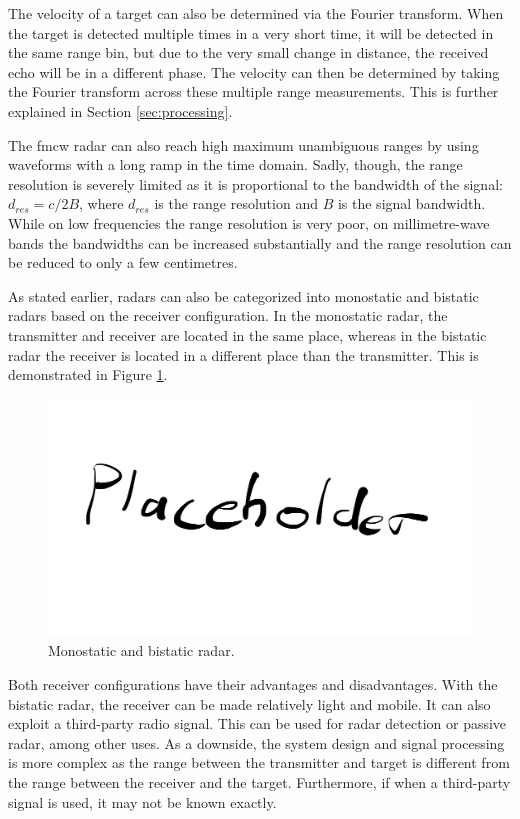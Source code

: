 The velocity of a target can also be determined via the Fourier transform.
When the target is detected multiple times in a very short time,
it will be detected in the same range bin,
but due to the very small change in distance,
the received echo will be in a different phase.
The velocity can then be determined 
by taking the Fourier transform across these multiple range measurements.
This is further explained in Section \ref{sec:processing}.

The \gls{fmcw} radar can also reach high maximum unambiguous ranges
by using waveforms with a long ramp in the time domain.
Sadly, though, the range resolution is severely limited 
as it is proportional to the bandwidth of the signal:
$d_{res} = c/2B$, where $d_{res}$ is the range resolution and $B$ is the signal bandwidth.
While on low frequencies the range resolution is very poor,
on millimetre-wave bands the bandwidths can be increased substantially 
and the range resolution can be reduced to only a few centimetres.

As stated earlier,
radars can also be categorized into monostatic and bistatic radars
based on the receiver configuration.
In the monostatic radar,
the transmitter and receiver are located in the same place,
whereas in the bistatic radar the receiver is located in a different place than the transmitter.
This is demonstrated in Figure \ref{fig:monostatic_bistatic}.

\begin{figure}
    \centering
    \includegraphics[width=\textwidth]{fig/placeholder.png}
    \caption{Monostatic and bistatic radar.}
    \label{fig:monostatic_bistatic}
\end{figure}

Both receiver configurations have their advantages and disadvantages.
With the bistatic radar, the receiver can be made relatively light and mobile.
It can also exploit a third-party radio signal.
This can be used for radar detection or passive radar, among other uses.
As a downside, the system design and signal processing is more complex 
as the range between the transmitter and target is different from the range between the receiver and the target.
Furthermore, if when a third-party signal is used, it may not be known exactly.


